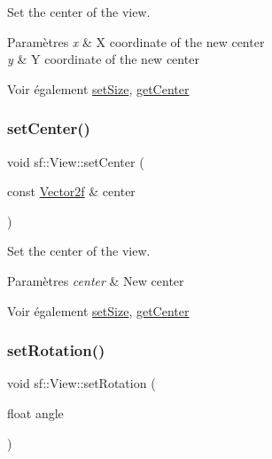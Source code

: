 Set the center of the view. 


\begin{DoxyParams}{Paramètres}
{\em x} & X coordinate of the new center \\
\hline
{\em y} & Y coordinate of the new center\\
\hline
\end{DoxyParams}
\begin{DoxySeeAlso}{Voir également}
\hyperlink{classsf_1_1View_a9525b73fe9fbaceb9568faf56b399dab}{set\+Size}, \hyperlink{classsf_1_1View_a7f4443c194c691ae4dcf8fd9dd0eaa46}{get\+Center} 
\end{DoxySeeAlso}
\mbox{\label{classsf_1_1View_ab0296b03793e0873e6ae9e15311f3e78}} 
\subsubsection{\texorpdfstring{set\+Center()}{setCenter()}\hspace{0.1cm}{\footnotesize\ttfamily [2/2]}}
{\footnotesize\ttfamily void sf\+::\+View\+::set\+Center (\begin{DoxyParamCaption}\item[{const \hyperlink{classsf_1_1Vector2}{Vector2f} \&}]{center }\end{DoxyParamCaption})}



Set the center of the view. 


\begin{DoxyParams}{Paramètres}
{\em center} & New center\\
\hline
\end{DoxyParams}
\begin{DoxySeeAlso}{Voir également}
\hyperlink{classsf_1_1View_a9525b73fe9fbaceb9568faf56b399dab}{set\+Size}, \hyperlink{classsf_1_1View_a7f4443c194c691ae4dcf8fd9dd0eaa46}{get\+Center} 
\end{DoxySeeAlso}
\mbox{\label{classsf_1_1View_a24d0503c9c51f5ef5918612786d325c1}} 
\subsubsection{\texorpdfstring{set\+Rotation()}{setRotation()}}
{\footnotesize\ttfamily void sf\+::\+View\+::set\+Rotation (\begin{DoxyParamCaption}\item[{float}]{angle }\end{DoxyParamCaption})}



